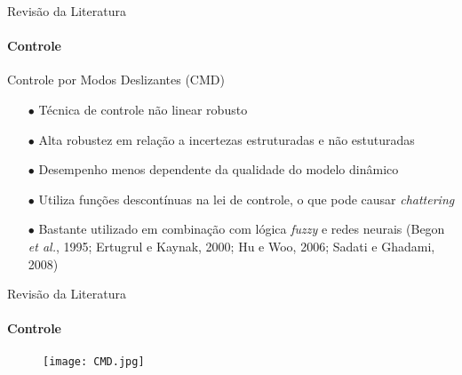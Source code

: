 \documentclass[25pt,landscape]{beamer}
\begin{document}
\begin{frame}{Revisão da Literatura}
    \framesubtitle{Controle}
    \begin{block}{Controle por Modos Deslizantes (CMD)}
        \begin{itemize}
            \item[$\bullet$] Técnica de controle não linear robusto \\[8pt]
            \item[$\bullet$] Alta robustez em relação a incertezas estruturadas e não estuturadas \\[8pt]
            \item[$\bullet$] Desempenho menos dependente da qualidade do modelo dinâmico \\[8pt]
            \item[$\bullet$] Utiliza funções descontínuas na lei de controle, o que pode causar \emph{chattering} \\[8pt]
            \item[$\bullet$] Bastante utilizado em combinação com lógica \emph{fuzzy} e redes neurais (Begon \emph{et al.}, 1995; Ertugrul e Kaynak, 2000; Hu e Woo, 2006; Sadati e Ghadami, 2008) \\[8pt]
        \end{itemize}
    \end{block}
\end{frame}

\begin{frame}{Revisão da Literatura}
    \framesubtitle{Controle}
    \begin{figure}[!h]
        \centering
        \texttt{[image: CMD.jpg]}
    \end{figure}  
\end{frame}
\end{document}
